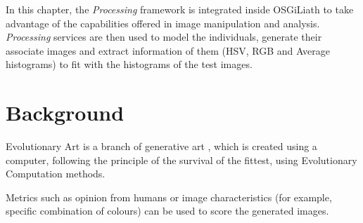 In this chapter, the {\em Processing} \cite{PROCESSING} framework is
integrated inside OSGiLiath %
to take advantage of the capabilities offered in image manipulation and analysis. 
{\em Processing} services are then used  to model the
individuals, generate their associate images and extract information
of them (HSV, RGB and Average histograms) to fit with the histograms
of the test images.



\section{Background}

Evolutionary Art \cite{EART} is a branch of generative art \cite{PHEROGRAPHY}, which is created using a
computer, following the principle of the survival of the fittest, 
using Evolutionary Computation methods.

Metrics such as opinion from humans or image characteristics (for
example, specific combination of colours) can be used to score the
generated images. %

